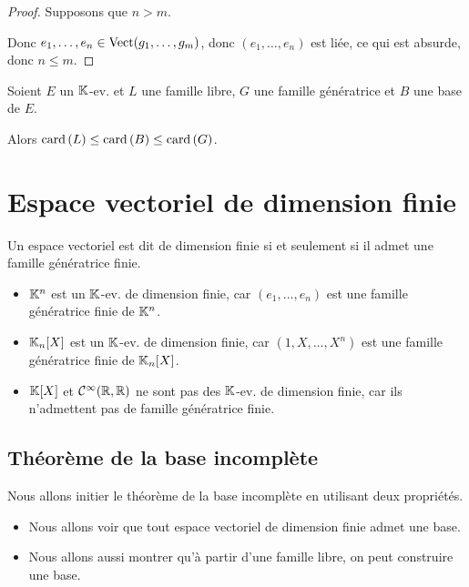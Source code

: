 \documentclass[12pt, a4paper]{report}
\begin{document}
\begin{proof}
    Supposons que $n > m$.

    Donc $e_1,\dots,e_n \in \mathrm{Vect}(g_1,\dots,g_m)$, donc $(e_1,\dots,e_n)$ est liée, ce qui est absurde, donc $n \le m$.
\end{proof}

\begin{consequence}
    Soient $E$ un $\mathbb{K}$-ev. et $L$ une famille libre, $G$ une famille génératrice et $B$ une base de $E$.

    Alors $\mathrm{card}\left(L\right) \le \mathrm{card}\left(B\right) \le \mathrm{card}\left(G\right)$.
\end{consequence}

\chapter{Espace vectoriel de dimension finie}

\begin{definition}
    Un espace vectoriel est dit de dimension finie si et seulement si il admet une famille génératrice finie.
\end{definition}

\begin{example}
    \begin{itemize}
        \item $\mathbb{K}^n$ est un $\mathbb{K}$-ev. de dimension finie, car $(e_1,\dots,e_n)$ est une famille génératrice finie de $\mathbb{K}^n$.
        \item $\mathbb{K}_n[X]$ est un $\mathbb{K}$-ev. de dimension finie, car $(1,X,\dots,X^n)$ est une famille génératrice finie de $\mathbb{K}_n[X]$.
        \item $\mathbb{K}[X]$ et $\mathcal{C}^{\infty}(\mathbb{R},\mathbb{R})$ ne sont pas des $\mathbb{K}$-ev. de dimension finie, car ils n'admettent pas de famille génératrice finie.
    \end{itemize}
\end{example}

\section{Théorème de la base incomplète}

Nous allons initier le théorème de la base incomplète en utilisant deux propriétés.
\begin{itemize}
    \item Nous allons voir que tout espace vectoriel de dimension finie admet une base.
    \item Nous allons aussi montrer qu'à partir d'une famille libre, on peut construire une base.
\end{itemize}
\end{document}
